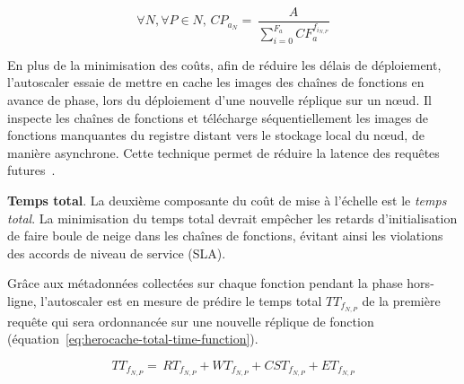 \begin{equation}
    \forall N, \forall P \in N, \, {CP}_{{a}_{N}} = \, \frac{A}{\sum_{i = 0}^{F_{a}} CF_{a}^{{f}_{i_{N, P}}}}
\label{eq:herocache-cache-proportion-app}
\end{equation}

En plus de la minimisation des coûts, afin de réduire les délais de déploiement, l'autoscaler essaie de mettre en cache les images des chaînes de fonctions en avance de phase, lors du déploiement d'une nouvelle réplique sur un nœud. Il inspecte les chaînes de fonctions et télécharge séquentiellement les images de fonctions manquantes du registre distant vers le stockage local du nœud, de manière asynchrone. Cette technique permet de réduire la latence des requêtes futures~\cite{leeSPESOptimizingPerformanceResource2024a}.

\textbf{Temps total}. La deuxième composante du coût de mise à l'échelle est le \textit{temps total}. La minimisation du temps total devrait empêcher les retards d'initialisation de faire boule de neige dans les chaînes de fonctions, évitant ainsi les violations des accords de niveau de service (SLA).

Grâce aux métadonnées collectées sur chaque fonction pendant la phase hors-ligne, l'autoscaler est en mesure de prédire le temps total ${TT}_{{f}_{N, P}}$ de la première requête qui sera ordonnancée sur une nouvelle réplique de fonction (équation~\ref{eq:herocache-total-time-function}).

\begin{equation}
    {TT}_{{f}_{N, P}} = \, {RT}_{{f}_{N, P}} + {WT}_{{f}_{N, P}} + {CST}_{{f}_{N, P}} + {ET}_{{f}_{N, P}}
\label{eq:herocache-total-time-function}
\end{equation}

